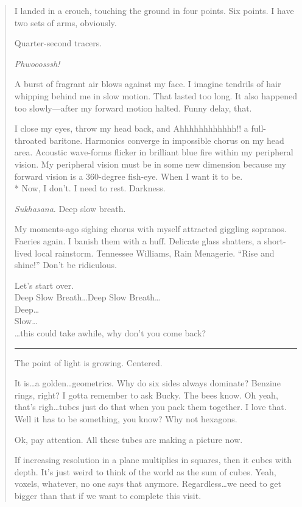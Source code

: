 \documentclass{UIdahoMastersThesis}
\begin{document}
\begin{quote}
{
I landed in a crouch, touching the ground in four points. Six points. I have two sets of arms, obviously.

Quarter-second tracers.

\textit{Phwooosssh!}

A burst of fragrant air blows against my face. I imagine tendrils of hair whipping behind me in slow motion. That lasted too long. It also happened too slowly---after my forward motion halted. Funny delay, that.

I close my eyes, throw my head back, and Ahhhhhhhhhhhh!! a full-throated baritone. Harmonics converge in impossible chorus on my head area. Acoustic wave-forms flicker in brilliant blue fire within my peripheral vision. My peripheral vision must be in some new dimension because my forward vision is a 360-degree fish-eye. When I want it to be.
\\*
Now, I don't. I need to rest. Darkness.

\textit{Sukhasana}. Deep slow breath.

My moments-ago sighing chorus with myself attracted giggling sopranos. Faeries again. I banish them with a huff. Delicate glass shatters, a short-lived local rainstorm. Tennessee Williams, Rain Menagerie. ``Rise and shine!'' Don't be ridiculous.

Let's start over.\\

Deep Slow Breath\ldots Deep Slow Breath\ldots \\
Deep\ldots \\
Slow\ldots \\
\ldots this could take awhile, why don't you come back?

\noindent\rule{2cm}{0.4pt}


The point of light is growing. Centered.

It is\ldots a golden\ldots geometrics. Why do six sides always dominate? Benzine rings, right? I gotta remember to ask Bucky. The bees know. Oh yeah, that's righ\ldots tubes just do that when you pack them together. I love that. Well it has to be something, you know? Why not hexagons.

Ok, pay attention. All these tubes are making a picture now.

If increasing resolution in a plane multiplies in squares, then it cubes with depth. It's just weird to think of the world as the sum of cubes. Yeah, voxels, whatever, no one says that anymore. Regardless\ldots we need to get bigger than that if we want to complete this visit.

}
\end{quote}
\end{document}
